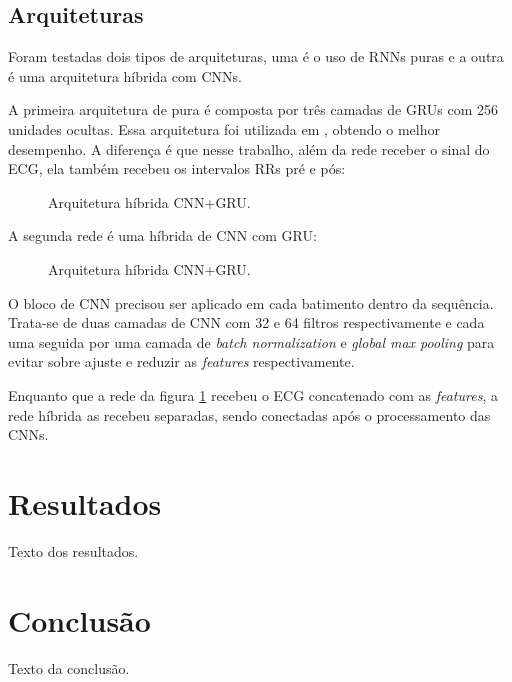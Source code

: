 \documentclass[
    12pt,                %
    openright,           %
    oneside,             %
    a4paper,             %
    brazil               %
]{abntex2}
\begin{document}
\section{Arquiteturas}
\label{sec:modelos}

Foram testadas dois tipos de arquiteturas, uma é o uso de RNNs puras e a outra é uma arquitetura híbrida com CNNs. 

A primeira arquitetura de pura é composta por três camadas de GRUs com 256 unidades ocultas. Essa arquitetura foi utilizada em , obtendo o melhor desempenho. 
A diferença é que nesse trabalho, além da rede receber o sinal do ECG, ela também recebeu os intervalos RRs pré e pós:


\begin{figure}[H]
  \centering
  \caption{Arquitetura híbrida CNN+GRU.}
  \label{fig:gru_pura}
\end{figure}

A segunda rede é uma híbrida de CNN com GRU:

\begin{figure}[H]
  \centering
  \caption{Arquitetura híbrida CNN+GRU.}
  \label{fig:cnn_gru}
\end{figure}

O bloco de CNN precisou ser aplicado em cada batimento dentro da sequência. Trata-se de duas camadas de CNN com 32 e 64 filtros respectivamente e cada 
uma seguida por uma camada de \textit{batch normalization} e \textit{global max pooling} para evitar sobre ajuste e reduzir as \textit{features} respectivamente.

Enquanto que a rede da figura \ref{fig:gru_pura} recebeu o ECG concatenado com as \textit{features}, a rede híbrida as recebeu separadas, sendo conectadas após o processamento
das CNNs.

\chapter{Resultados}
Texto dos resultados.

\chapter{Conclusão}
Texto da conclusão.



\end{document}
